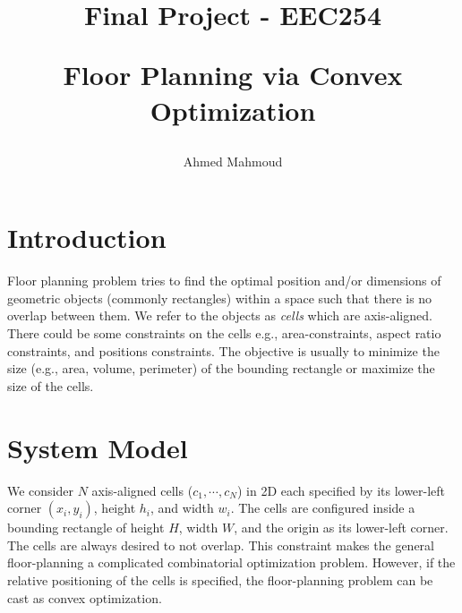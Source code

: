 \documentclass[12pt] {article}
\begin{document}

\title{
Final Project -  EEC254 \\
\begin{large}
Floor Planning via Convex Optimization
\end{large}
}
\author{Ahmed Mahmoud}
\date{}
\maketitle



\section{Introduction}
Floor planning problem tries to find the optimal position and/or dimensions of geometric objects (commonly rectangles) within a space such that there is no overlap between them. We refer to the objects as \emph{cells} which are axis-aligned. There could be some constraints on the cells e.g., area-constraints, aspect ratio constraints, and positions constraints. The objective is usually to minimize the size (e.g., area, volume, perimeter) of the bounding rectangle or maximize the size of the cells.

\section{System Model}
We consider $N$ axis-aligned cells ($c_{1}, \cdots, c_{N}$) in 2D each specified by its lower-left corner $(x_{i}, y_{i})$, height $h_{i}$, and width $w_{i}$. The cells are configured inside a bounding rectangle of height $H$, width $W$, and the origin as its lower-left corner. The cells are always desired to not overlap. This constraint makes the general floor-planning a complicated combinatorial optimization problem. However, if the relative positioning of the cells is specified, the floor-planning problem can be cast as convex optimization. 
\end{document}
